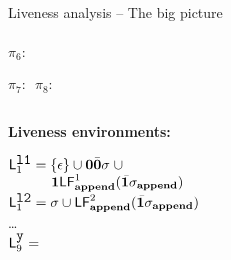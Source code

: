 \documentclass[xcolor=x11names,compress,mathserif]{beamer}
\renewcommand{\(}{\begin{columns}}
\renewcommand{\)}{\end{columns}}
\newcommand{\<}[1]{\begin{column}{#1}}
\renewcommand{\>}{\end{column}}
\begin{document}
\begin{frame}[t]{Liveness analysis -- The big picture}
\begin{columns}[c]
\begin{column}[T]{0.6\textwidth}
{\begin{uprogram}
          \hspace*{-2.4cm} \hspace*{.05cm}   $\pi_6\!\!:\, $


          \hspace*{-2.7cm}  \hspace*{.05cm}   $\pi_7\!\!:\,$
$\pi_8\!\!:\, $ 
\end{uprogram}}
 \end{column}
\end{columns}

\bigskip
\bigskip

\footnotesize
\begin{columns}[c]
 \begin{column}[T]{0.40\textwidth}
\scriptsize
\centerline{\bf Liveness environments:}

\bigskip

$\mathsf{L}_{{1}}^{\mbox{\tt l1}} = \{\epsilon\} \cup  \mathbf{0}\bar{\mathbf{0}}\sigma\; \cup $\\
$\;\;\;\;\;\;\;\;\;\;\;\mathbf{1}\mathsf{LF}_{\mathit {\mathbf{append}}}^{1}( {\mathit {\bar{\mathbf{1}}}\sigma_{\mathbf{append}}})$\\
$\mathsf{L}_{{1}}^{\mbox{\tt l2}} = \sigma \cup \mathsf{LF}_{\mathit {\mathbf{append}}}^{2}( {\mathit {\bar{\mathbf{1}}}\sigma_{\mathbf{append}}})$\\
\ldots\\
$\mathsf{L}_{{9}}^{\mbox{\tt y}}  = $  \\



\end{column}
\end{columns}
\end{frame}
\end{document}
